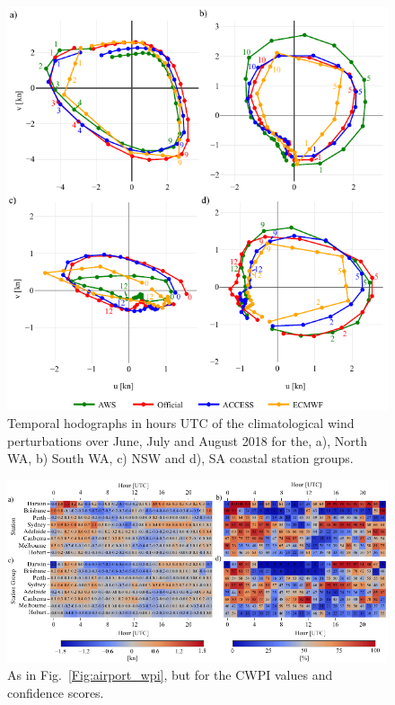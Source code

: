\documentclass[twocol]{ametsoc}
\begin{document}
\begin{figure}
\centering
\includegraphics[width=33pc]{clim_hodo.pdf}
\caption{Temporal hodographs in hours UTC of the climatological wind perturbations over June, July and August 2018 for the, a), North WA, b) South WA, c) NSW and d), SA coastal station groups.}
\label{Fig:clim_hodo}
\end{figure}

\begin{figure}
\centering
\includegraphics[width=39pc]{airport_cwpi.pdf}
\caption{As in Fig.~\ref{Fig:airport_wpi}, but for the CWPI values and confidence scores.}
\label{Fig:airport_cwpi}
\end{figure}
\end{document}
